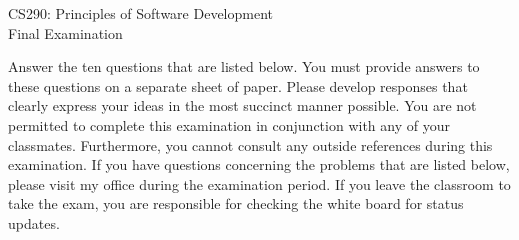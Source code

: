 \documentclass[12pt,epsf,psfig,graphics]{article}
\def\widow#1{\vskip #1\vbadness10000\penalty-200\vskip-#1}
\begin{document}
\def\widow#1{\vskip #1\vbadness10000\penalty-200\vskip-#1}

\begin{center}

CS290: Principles of Software Development \\
Final Examination \\

\end{center}

\noindent
Answer the ten questions that are listed below.  You must provide
answers to these questions on a separate sheet of paper.  Please
develop responses that clearly express your ideas in the most succinct
manner possible.  You are not permitted to complete this examination
in conjunction with any of your classmates.  Furthermore, you cannot
consult any outside references during this examination.  If you have
questions concerning the problems that are listed below, please visit
my office during the examination period.  If you leave the classroom
to take the exam, you are responsible for checking the white board for
status updates.

\end{document}
